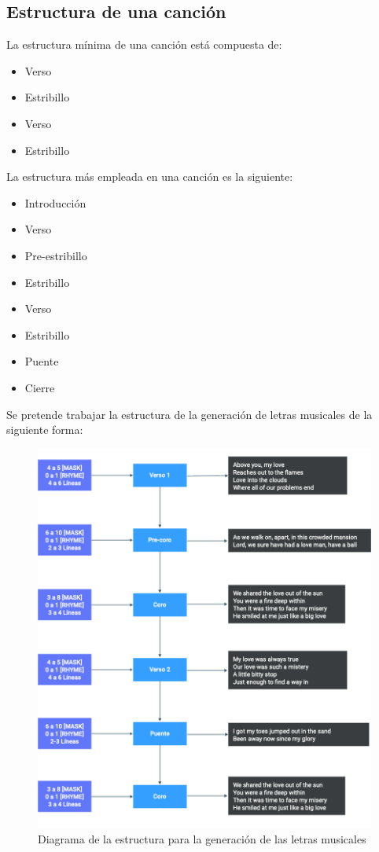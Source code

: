 \documentclass[12pt, a4paper, titlepage]{report}
\begin{document}
			\subsection{Estructura de una canción}
			La estructura mínima de una canción está compuesta de:\par
			\begin{itemize}
			  \item Verso
			  \item Estribillo
			  \item Verso
			  \item Estribillo
			\end{itemize}\par
			La estructura más empleada en una canción es la siguiente:
			\begin{itemize}
			  \item Introducción
			  \item Verso
			  \item Pre-estribillo
			  \item Estribillo
			  \item Verso
			  \item Estribillo
			  \item Puente
			  \item Cierre
			\end{itemize}
		
			Se pretende trabajar la estructura de la generación de letras musicales de la siguiente forma:
			
			\begin{figure}[H] \caption{Diagrama de la estructura para la generación de las letras musicales}
				\includegraphics[scale=.45]{./imagenes/Disenio/Arquitectura/Generacion_letras.png}
				\centering 
			\end{figure}
		
\end{document}
